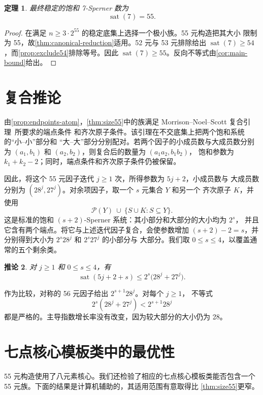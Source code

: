 \documentclass[UTF8,11pt,a4paper,fontset=fandol]{ctexart}
\newtheorem{theorem}{定理}[section]
\newtheorem{corollary}[theorem]{推论}
\theoremstyle{definition}
\theoremstyle{remark}
\newcommand{\powerset}{\mathcal{P}}
\newcommand{\sat}{\operatorname{sat}}
\begin{document}
\begin{theorem}
\label{thm:sat7}
最终稳定的饱和 7-Sperner 数为
\[
  \sat(7)=55.
\]
\end{theorem}

\begin{proof}
在满足 $n\geq3\cdot2^{55}$ 的稳定底集上选择一个极小族。55 元构造把其大小
限制为 55，故\cref{thm:canonical-reduction}适用。52 元与 53 元排除给出
$\sat(7)\geq54$，而\cref{prop:exclude54}排除等号。因此
$\sat(7)\geq55$。反向不等式由\cref{cor:main-bound}给出。
\end{proof}

\section{复合推论}
\label{sec:composition}

由\cref{prop:endpoints-atom}，\cref{thm:size55}中的族满足
Morrison--Noel--Scott 复合引理~\cite[Lemma~18]{mns2014}所要求的端点条件
和齐次原子条件。该引理在不交底集上把两个饱和系统的“小--小”部分和
“大--大”部分分别配对。若两个因子的小成员数与大成员数分别为
$(a_1,b_1)$ 和 $(a_2,b_2)$，则复合后的数量为 $(a_1a_2,b_1b_2)$，
饱和参数为 $k_1+k_2-2$；同时，端点条件和齐次原子条件仍被保留。

因此，将这个 55 元因子迭代 $j\geq1$ 次，所得参数为 $5j+2$，小成员数与
大成员数分别为 $(28^j,27^j)$。对余项因子，取一个 $s$ 元集合 $Y$ 和另一个
齐次原子 $K$，并使用
\[
  \powerset(Y)\ \cup\ \{S\cup K:S\subseteq Y\}.
\]
这是标准的饱和 $(s+2)$-Sperner 系统：其小部分和大部分的大小均为 $2^s$，
并且它含有两个端点。将它与上述迭代因子复合，会使参数增加
$(s+2)-2=s$，并分别得到大小为 $2^s28^j$ 和 $2^s27^j$ 的小部分与
大部分。我们取 $0\leq s\leq4$，以覆盖通常的五个剩余类。

\begin{corollary}
\label{cor:discrete-bound}
对 $j\geq1$ 和 $0\leq s\leq4$，有
\[
  \sat(5j+2+s)\leq 2^s\bigl(28^j+27^j\bigr).
\]
\end{corollary}

作为比较，对称的 56 元因子给出 $2^{s+1}28^j$。对每个 $j\geq1$，
不等式
\[
  2^s(28^j+27^j)<2^{s+1}28^j
\]
都是严格的。主导指数增长率没有改变，因为较大部分的大小仍为 28。

\section{七点核心模板类中的最优性}
\label{sec:class-optimality}

55 元构造使用了八元素核心。我们还检验了相应的七点核心模板类能否包含一个
55 元族。下面的结果是计算机辅助的，其适用范围有意取得比
\cref{thm:size55}更窄。
\end{document}
